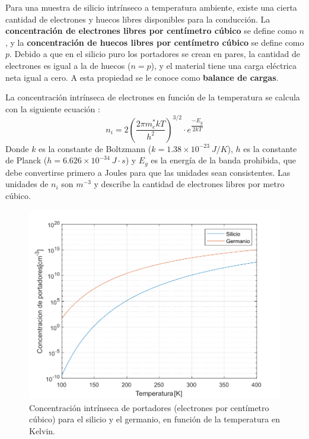Para una muestra de silicio intrínseco a temperatura ambiente, existe una cierta cantidad de electrones y huecos libres disponibles para la conducción. La \textbf{concentración de electrones libres por centímetro cúbico} se define como $n$, y la \textbf{concentración de huecos libres por centímetro cúbico} se define como $p$. Debido a que en el silicio puro los portadores se crean en pares, la cantidad de electrones es igual a la de huecos ($n=p$), y el material tiene una carga eléctrica neta igual a cero. A esta propiedad se le conoce como \textbf{balance de cargas}.

La concentración intrínseca de electrones en función de la temperatura se calcula con la siguiente ecuación \cite{b11}:
%
\[ n_i = 2 \left( \dfrac{2 \pi m^*_e k T}{h^2} \right)^{3/2} \cdot e^{\dfrac{-E_g}{2kT}} \]
%
Donde $k$ es la constante de Boltzmann ($k=1.38\times{}10^{-23}\ J/K$), $h$ es la constante de Planck ($h=6.626\times{}10^{-34}\ J\cdot{}s$) y $E_g$ es la energía de la banda prohibida, que debe convertirse primero a Joules para que las unidades sean consistentes. Las unidades de $n_i$ son $m^{-3}$ y describe la cantidad de electrones libres por metro cúbico. 

\begin{figure}[H]
    \centering
    \includegraphics[width=14cm]{figuras/concentracion_intrinseca_portadores.pdf}
    \caption{Concentración intrínseca de portadores (electrones por centímetro cúbico) para el silicio y el germanio, en función de la temperatura en Kelvin.}
    \label{concentracion_intrinseca_vs_T}
\end{figure}

